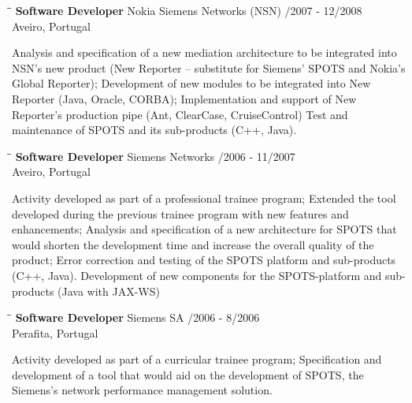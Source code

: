 \documentclass{res}
\begin{document}
\begin{resume}
\begin{tabbing}
\hspace{2.3in}\= \hspace{2.6in}\= \kill %
{\bf Software Developer} \>Nokia Siemens Networks (NSN)    
/2007 - 12/2008\\ \>Aveiro, Portugal
\end{tabbing}\vspace{-20pt}      %
Analysis and specification of a new mediation architecture to be integrated
into NSN’s new product  (New Reporter – substitute for Siemens’ SPOTS and
Nokia’s Global Reporter); Development of new modules to be integrated into New
Reporter (Java, Oracle, CORBA); Implementation and support of New Reporter’s
production pipe (Ant, ClearCase, CruiseControl) Test and maintenance of SPOTS
and its sub-products (C++, Java).

\begin{tabbing}
\hspace{2.3in}\= \hspace{2.6in}\= \kill %
{\bf Software Developer} \>Siemens Networks    
/2006 - 11/2007\\ \>Aveiro, Portugal
\end{tabbing}\vspace{-20pt}      %
Activity developed as part of a professional trainee program;
Extended the tool developed during the previous trainee program with new
features and enhancements; Analysis and specification of a new architecture for
SPOTS that would shorten the development time and increase the overall quality
of the product; Error correction and testing of the SPOTS platform and
sub-products (C++, Java). Development of new components for the SPOTS-platform
and sub-products (Java with JAX-WS)

\begin{tabbing}
\hspace{2.3in}\= \hspace{2.6in}\= \kill %
{\bf Software Developer} \>Siemens SA    
/2006 - 8/2006\\ \>Perafita, Portugal
\end{tabbing}\vspace{-20pt}      %
Activity developed as part of a curricular trainee program;
Specification and development of a tool that would aid on the development of
SPOTS, the Siemens’s network performance management solution.


\end{resume}
\end{document}
